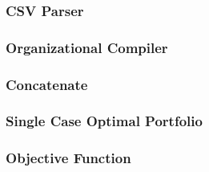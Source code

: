 \subsubsection{CSV Parser}



\pagebreak
\subsubsection{Organizational Compiler}



\pagebreak
\subsubsection{Concatenate}

\subsubsection{Single Case Optimal Portfolio}



\pagebreak
\subsubsection{Objective Function}
